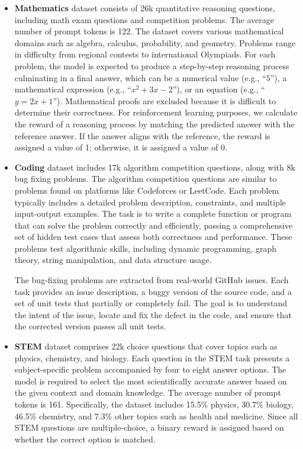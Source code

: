\begin{itemize}
\item \textbf{Mathematics} dataset consists of 26k quantitative reasoning questions, including math exam questions and competition problems. The average number of prompt tokens is 122. The dataset covers various mathematical domains such as algebra, calculus, probability, and geometry. Problems range in difficulty from regional contests to international Olympiads.
For each problem, the model is expected to produce a step-by-step reasoning process culminating in a final answer, which can be a numerical value (e.g., ``$5$''), a mathematical expression (e.g., ``$x^2 + 3x - 2$''), or an equation (e.g., ``$y = 2x + 1$''). Mathematical proofs are excluded because it is difficult to determine their correctness.
For reinforcement learning purposes, we calculate the reward of a reasoning process by matching the predicted answer with the reference answer. If the answer aligns with the reference, the reward is assigned a value of 1; otherwise, it is assigned a value of 0.


\item \textbf{Coding} dataset includes 17k algorithm competition questions, along with 8k bug fixing problems. The algorithm competition questions are similar to problems found on platforms like Codeforces or LeetCode. Each problem typically includes a detailed problem description, constraints, and multiple input-output examples. The task is to write a complete function or program that can solve the problem correctly and efficiently, passing a comprehensive set of hidden test cases that assess both correctness and performance. These problems test algorithmic skills, including dynamic programming, graph theory, string manipulation, and data structure usage. 

The bug-fixing problems are extracted from real-world GitHub issues. Each task provides an issue description, a buggy version of the source code, and a set of unit tests that partially or completely fail. The goal is to understand the intent of the issue, locate and fix the defect in the code, and ensure that the corrected version passes all unit tests. 


\item \textbf{STEM} dataset comprises 22k choice questions that cover topics such as physics, chemistry, and biology. Each question in the STEM task presents a subject-specific problem accompanied by four to eight answer options. The model is required to select the most scientifically accurate answer based on the given context and domain knowledge. The average number of prompt tokens is 161. Specifically, the dataset includes 15.5\% physics, 30.7\% biology, 46.5\% chemistry, and 7.3\% other topics such as health and medicine. Since all STEM questions are multiple-choice, a binary reward is assigned based on whether the correct option is matched.



\end{itemize}
